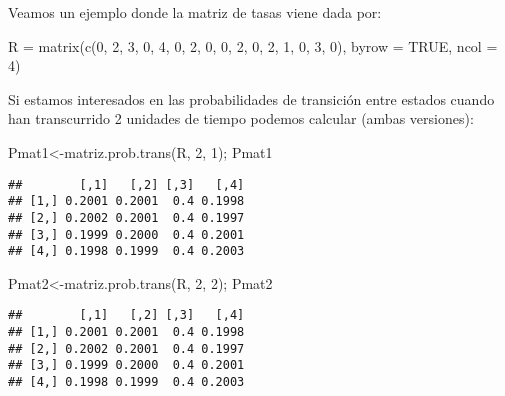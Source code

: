 \documentclass[
]{book}
\newenvironment{Shaded}{\begin{snugshade}}{\end{snugshade}}
\newcommand{\AttributeTok}[1]{\textcolor[rgb]{0.77,0.63,0.00}{#1}}
\newcommand{\ConstantTok}[1]{\textcolor[rgb]{0.00,0.00,0.00}{#1}}
\newcommand{\DecValTok}[1]{\textcolor[rgb]{0.00,0.00,0.81}{#1}}
\newcommand{\FunctionTok}[1]{\textcolor[rgb]{0.00,0.00,0.00}{#1}}
\newcommand{\NormalTok}[1]{#1}
\newcommand{\OtherTok}[1]{\textcolor[rgb]{0.56,0.35,0.01}{#1}}
\theoremstyle{definition}
\theoremstyle{definition}
\theoremstyle{definition}
\theoremstyle{definition}
\theoremstyle{remark}
\begin{document}
Veamos un ejemplo donde la matriz de tasas viene dada por:

\begin{Shaded}
\begin{Highlighting}[]
\NormalTok{R }\OtherTok{=} \FunctionTok{matrix}\NormalTok{(}\FunctionTok{c}\NormalTok{(}\DecValTok{0}\NormalTok{, }\DecValTok{2}\NormalTok{, }\DecValTok{3}\NormalTok{, }\DecValTok{0}\NormalTok{, }\DecValTok{4}\NormalTok{, }\DecValTok{0}\NormalTok{, }\DecValTok{2}\NormalTok{, }\DecValTok{0}\NormalTok{, }\DecValTok{0}\NormalTok{, }\DecValTok{2}\NormalTok{, }\DecValTok{0}\NormalTok{, }\DecValTok{2}\NormalTok{, }\DecValTok{1}\NormalTok{, }\DecValTok{0}\NormalTok{, }\DecValTok{3}\NormalTok{, }\DecValTok{0}\NormalTok{), }\AttributeTok{byrow =} \ConstantTok{TRUE}\NormalTok{, }\AttributeTok{ncol =} \DecValTok{4}\NormalTok{)}
\end{Highlighting}
\end{Shaded}

Si estamos interesados en las probabilidades de transición entre estados cuando han transcurrido 2 unidades de tiempo podemos calcular (ambas versiones):

\begin{Shaded}
\begin{Highlighting}[]
\NormalTok{Pmat1}\OtherTok{\textless{}{-}}\FunctionTok{matriz.prob.trans}\NormalTok{(R, }\DecValTok{2}\NormalTok{, }\DecValTok{1}\NormalTok{); Pmat1}
\end{Highlighting}
\end{Shaded}

\begin{verbatim}
##        [,1]   [,2] [,3]   [,4]
## [1,] 0.2001 0.2001  0.4 0.1998
## [2,] 0.2002 0.2001  0.4 0.1997
## [3,] 0.1999 0.2000  0.4 0.2001
## [4,] 0.1998 0.1999  0.4 0.2003
\end{verbatim}

\begin{Shaded}
\begin{Highlighting}[]
\NormalTok{Pmat2}\OtherTok{\textless{}{-}}\FunctionTok{matriz.prob.trans}\NormalTok{(R, }\DecValTok{2}\NormalTok{, }\DecValTok{2}\NormalTok{); Pmat2}
\end{Highlighting}
\end{Shaded}

\begin{verbatim}
##        [,1]   [,2] [,3]   [,4]
## [1,] 0.2001 0.2001  0.4 0.1998
## [2,] 0.2002 0.2001  0.4 0.1997
## [3,] 0.1999 0.2000  0.4 0.2001
## [4,] 0.1998 0.1999  0.4 0.2003
\end{verbatim}
\end{document}

